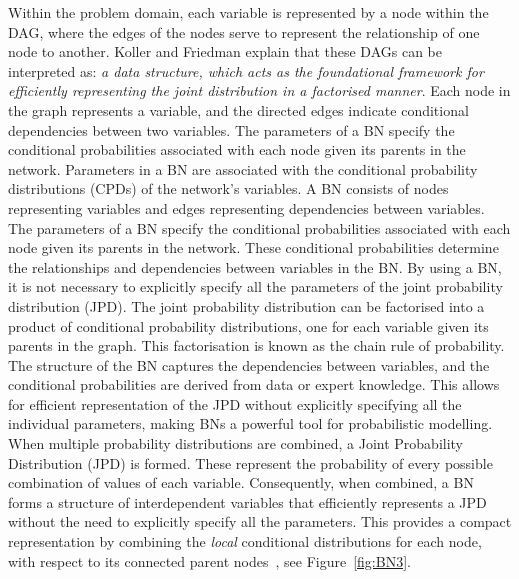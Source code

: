 \documentclass[journal]{IEEEtran}
\begin{document}
Within the problem domain, each variable is represented by a node within the DAG, where the edges of the nodes serve to represent the relationship of one node to another. Koller and Friedman explain that these DAGs can be interpreted as: \textit{a data structure, which acts as the foundational framework for efficiently representing the joint distribution in a factorised manner}. Each node in the graph represents a variable, and the directed edges indicate conditional dependencies between two variables. The parameters of a BN specify the conditional probabilities associated with each node given its parents in the network. Parameters in a BN are associated with the conditional probability distributions (CPDs) of the network's variables. A BN consists of nodes representing variables and edges representing dependencies between variables. The parameters of a BN specify the conditional probabilities associated with each node given its parents in the network. These conditional probabilities determine the relationships and dependencies between variables in the BN. By using a BN, it is not necessary to explicitly specify all the parameters of the joint probability distribution (JPD). The joint probability distribution can be factorised into a product of conditional probability distributions, one for each variable given its parents in the graph. This factorisation is known as the chain rule of probability. The structure of the BN captures the dependencies between variables, and the conditional probabilities are derived from data or expert knowledge. This allows for efficient representation of the JPD without explicitly specifying all the individual parameters, making BNs a powerful tool for probabilistic modelling. When multiple probability distributions are combined, a Joint Probability Distribution (JPD) is formed. These represent the probability of every possible combination of values of each variable. Consequently, when combined, a BN forms a structure of interdependent variables that efficiently represents a JPD without the need to explicitly specify all the parameters. This provides a compact representation by combining the \textit{local} conditional distributions for each node, with respect to its connected parent nodes~\cite{Koller2009}, see Figure~\ref{fig:BN3}.
\end{document}
